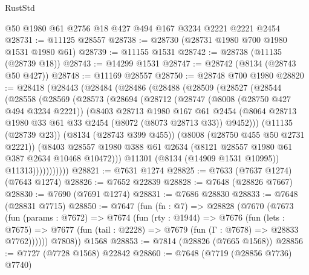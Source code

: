 \begin{lexlean}{RustStd}
\begin{coremodule}
{\begin{coremodule}
{{{{{{{{{{{{{{{{{{{{{{{{{{{{{{{{{{{{{{{{{{{{{{{{{{{{{    @50
    @1980
    @61
    @2756
    @18
    @427
    @494
    @167
    @3234
    @2221
    @2221
    @2454
@28731 := @11125 @28557
@28738 := @28730 (@28731 @1980 @700 @1980 @1531 @1980 @61)
@28739 := @11155 @1531
@28742 := @28738 (@11135 (@28739 @18))
@28743 := @14299 @1531
@28747 := @28742 (@8134 (@28743 @50 @427))
@28748 := @11169 @28557
@28750 := @28748 @700 @1980
@28820 := @28418
    (@28443
      (@28484
        (@28486
          (@28488
            (@28509
              (@28527
                (@28544
                  (@28558
                    (@28569
                      (@28573
                        (@28694
                          (@28712
                            (@28747
                              (@8008 (@28750 @427 @494 @3234 @2221))
                              (@8403
                                @28713
                                @1980
                                @167
                                @61
                                @2454
                                (@8064
                                  @28713
                                  @1980
                                  @33
                                  @61
                                  @33
                                  @2454
                                  (@8072 (@8073 @28713 @33))
                                  @9452)))
                            (@11135 (@28739 @23))
                            (@8134 (@28743 @399 @455))
                            (@8008 (@28750 @455 @50 @2731 @2221))
                            (@8403
                              @28557
                              @1980
                              @388
                              @61
                              @2634
                              (@8121 @28557 @1980 @61 @387 @2634 @10468 @10472)))
                          @11301
                          (@8134 (@14909 @1531 @10995))
                          @11313)))))))))))
@28821 := @7631 @1274
@28825 := @7633 (@7637 @1274) (@7643 @1274)
@28826 := @7652 @22839
@28828 := @7648 (@28826 @7667)
@28830 := @7690 (@7691 @1274)
@28831 := @7686 @28830
@28833 := @7648 (@28831 @7715)
@28850 := @7647
    (fun (fn : @7) =>
    @28828
      (@7670
        (@7673
          (fun (params : @7672) =>
          @7674
            (fun (rty : @1944) =>
            @7676
              (fun (lets : @7675) =>
              @7677 (fun (tail : @2228) => @7679 (fun (Γ : @7678) => @28833 @7762))))))
        @7808))
    @1568
@28853 := @7814 (@28826 (@7665 @1568))
@28856 := @7727 (@7728 @1568) @22842
@28860 := @7648 (@7719 (@28856 @7736) @7740)
}}}}}}}}}}}}}}}}}}}}}}}}}}}}}}}}}}}}}}}}}}}}}}}}}}}}}
\end{coremodule}}
\end{coremodule}
\end{lexlean}
